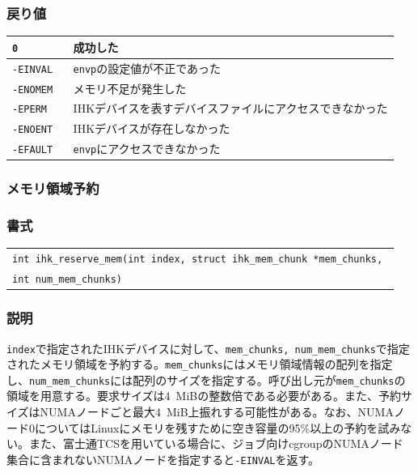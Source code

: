 \documentclass[twoside,11pt,fleqn]{book}
\begin{document}
\subsubsection*{戻り値}
\begin{table}[!h]
\footnotesize
\begin{tabular}{|p{0.15\linewidth}|p{0.80\linewidth}|} \hline
\verb:0:&	成功した\\ \hline
\verb:-EINVAL:&	\verb:envp:の設定値が不正であった\\ \hline
\verb:-ENOMEM:&	メモリ不足が発生した\\ \hline
\verb:-EPERM:&	IHKデバイスを表すデバイスファイルにアクセスできなかった\\ \hline
\verb:-ENOENT:&	IHKデバイスが存在しなかった\\ \hline
\verb:-EFAULT:&	\texttt{envp}にアクセスできなかった\\ \hline
\end{tabular}
\vspace{-0em}
\end{table}
\FloatBarrier

\subsubsection{メモリ領域予約}
\subsubsection*{書式}
\begin{tabular}[t]{@{}l@{}}
{\quad} \texttt{int ihk\_reserve\_mem(int index, struct ihk\_mem\_chunk *mem\_chunks, }\\
{\quad}{\quad} \texttt{int num\_mem\_chunks)}\\
\end{tabular}
\subsubsection*{説明}{\quad} \texttt{index}で指定されたIHKデバイスに対して、\texttt{mem\_chunks, num\_mem\_chunks}で指定されたメモリ領域を予約する。\texttt{mem\_chunks}にはメモリ領域情報の配列を指定し、\texttt{num\_mem\_chunks}には配列のサイズを指定する。呼び出し元が\texttt{mem\_chunks}の領域を用意する。要求サイズは4~MiBの整数倍である必要がある。また、予約サイズはNUMAノードごと最大4~MiB上振れする可能性がある。なお、NUMAノード0についてはLinuxにメモリを残すために空き容量の95\%以上の予約を試みない。また、富士通TCSを用いている場合に、ジョブ向けcgroupのNUMAノード集合に含まれないNUMAノードを指定すると\verb:-EINVAL:を返す。
\end{document}
